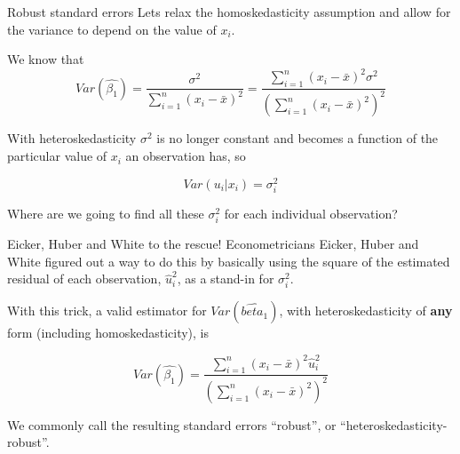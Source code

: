 \documentclass[
  ignorenonframetext,
]{beamer}
\begin{document}
\begin{frame}{Robust standard errors}
\protect\hypertarget{robust-standard-errors-6}{}
Lets relax the homoskedasticity assumption and allow for the variance to
depend on the value of \(x_i\).

We know that \[
Var(\hat{\beta_1})=\frac{\sigma^2}{\sum_{i=1}^n(x_i-\bar{x})^2}=\frac{\sum_{i=1}^n(x_i-\bar{x})^2\sigma^2}{(\sum_{i=1}^n(x_i-\bar{x})^2)^2}
\]

With heteroskedasticity \(\sigma^2\) is no longer constant and becomes a
function of the particular value of \(x_i\) an observation has, so

\[
Var(u_i|x_i)=\sigma^2_i
\]

Where are we going to find all these \(\sigma_i^2\) for each individual
observation?
\end{frame}

\begin{frame}{Eicker, Huber and White to the rescue!}
\protect\hypertarget{eicker-huber-and-white-to-the-rescue}{}
Econometricians Eicker, Huber and White figured out a way to do this by
basically using the square of the estimated residual of each
observation, \(\hat{u}_i^2\), as a stand-in for \(\sigma^2_i\).

With this trick, a valid estimator for \(Var(\hat{beta_1})\), with
heteroskedasticity of \textbf{any} form (including homoskedasticity), is

\[
Var(\hat{\beta_1})=\frac{\sum_{i=1}^n(x_i-\bar{x})^2\hat{u}_i^2}{(\sum_{i=1}^n(x_i-\bar{x})^2)^2}
\]

We commonly call the resulting standard errors ``robust'', or
``heteroskedasticity-robust''.
\end{frame}
\end{document}
